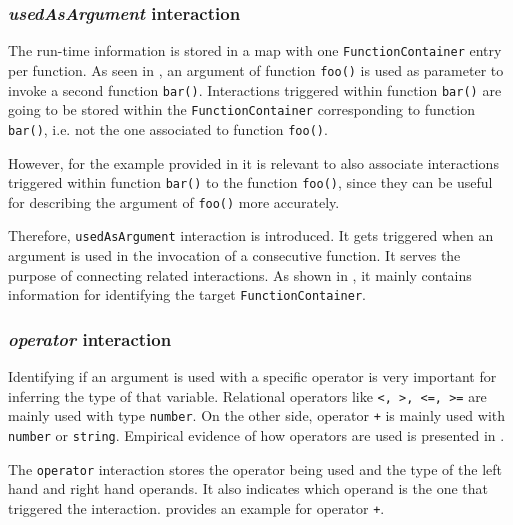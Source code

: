 


\subsubsection{\textit{usedAsArgument} interaction}
The run-time information is stored in a map with one \texttt{FunctionContainer} entry per function. As seen in , an argument of function \texttt{foo()} is used as parameter to invoke a second function \texttt{bar()}. Interactions triggered within function \texttt{bar()} are going to be stored within the \texttt{FunctionContainer} corresponding to function \texttt{bar()}, i.e. not the one associated to function \texttt{foo()}.

However, for the example provided in  it is relevant to also associate interactions triggered within function \texttt{bar()} to the function \texttt{foo()}, since they can  be useful for describing the argument of \texttt{foo()} more accurately.

Therefore, \texttt{usedAsArgument} interaction is introduced. It gets triggered when an argument is used in the invocation of a consecutive function. It serves the purpose of connecting related interactions. As shown in , it mainly contains information for identifying the target \texttt{FunctionContainer}.



\subsubsection{\textit{operator} interaction}
Identifying if an argument is used with a specific operator is very important for inferring the type of that variable. Relational operators like \texttt{<, >, <=, >=} are mainly used with type \texttt{number}. On the other side, operator \texttt{+} is mainly used with \texttt{number} or \texttt{string}. Empirical evidence of how operators are used is presented in .

The \texttt{operator} interaction stores the operator being used and the type of the left hand and right hand operands. It also indicates which operand is the one that triggered the interaction.  provides an example for operator \texttt{+}.

